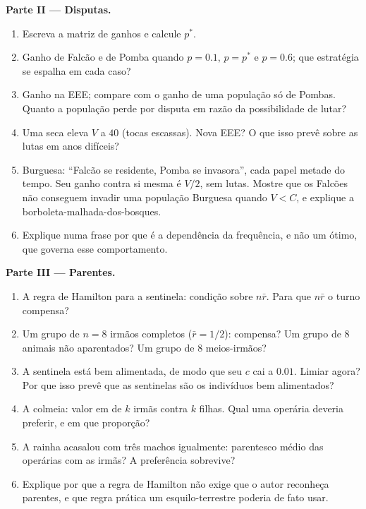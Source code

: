 \begin{problem}
\medskip
\noindent\textbf{Parte II --- Disputas.}
\begin{enumerate}[resume]
  \item Escreva a matriz de ganhos e calcule $p^{*}$.
  \item Ganho de Falcão e de Pomba quando $p = 0.1$, $p = p^{*}$ e $p =
        0.6$; que estratégia se espalha em cada caso?
  \item Ganho na EEE; compare com o ganho de uma população só de Pombas.
        Quanto a população perde por disputa em razão da possibilidade de
        lutar?
  \item Uma seca eleva $V$ a $40$ (tocas escassas). Nova EEE? O que isso
        prevê sobre as lutas em anos difíceis?
  \item Burguesa: ``Falcão se residente, Pomba se invasora'', cada papel
        metade do tempo. Seu ganho contra si mesma é $V/2$, sem lutas.
        Mostre que os Falcões não conseguem invadir uma população Burguesa
        quando $V
        < C$, e explique a borboleta-malhada-dos-bosques.
  \item Explique numa frase por que é a dependência da frequência, e não
        um ótimo, que governa esse comportamento.
\end{enumerate}

\medskip
\noindent\textbf{Parte III --- Parentes.}
\begin{enumerate}[resume]
  \item A regra de Hamilton para a sentinela: condição sobre $n\bar r$.
        Para que $n\bar r$ o turno compensa?
  \item Um grupo de $n = 8$ irmãos completos ($\bar r = 1/2$): compensa?
        Um grupo de 8 animais não aparentados? Um grupo de 8
        meios-irmãos?
  \item A sentinela está bem alimentada, de modo que seu $c$ cai a
        $0.01$. Limiar agora? Por que isso prevê que as sentinelas são os
        indivíduos bem alimentados?
  \item A colmeia: valor em  de $k$ irmãs contra $k$
        filhas. Qual uma operária deveria preferir, e em que proporção?
  \item A rainha acasalou com três machos igualmente: parentesco médio
        das operárias com as irmãs? A preferência sobrevive?
  \item Explique por que a regra de Hamilton não exige que o autor
        reconheça parentes, e que regra prática um esquilo-terrestre
        poderia de fato usar.
\end{enumerate}


\end{problem}
